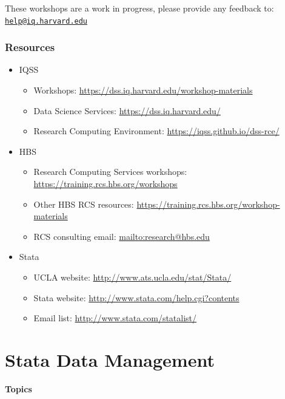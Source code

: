 \documentclass[]{book}
\providecommand{\tightlist}{%
  \setlength{\itemsep}{0pt}\setlength{\parskip}{0pt}}
\begin{document}
These workshops are a work in progress, please provide any feedback to:
\href{mailto:help@iq.harvard.edu}{\nolinkurl{help@iq.harvard.edu}}

\subsection{Resources}\label{resources-7}

\begin{itemize}
\tightlist
\item
  IQSS

  \begin{itemize}
  \tightlist
  \item
    Workshops: \url{https://dss.iq.harvard.edu/workshop-materials}
  \item
    Data Science Services: \url{https://dss.iq.harvard.edu/}
  \item
    Research Computing Environment:
    \url{https://iqss.github.io/dss-rce/}
  \end{itemize}
\item
  HBS

  \begin{itemize}
  \tightlist
  \item
    Research Computing Services workshops:
    \url{https://training.rcs.hbs.org/workshops}
  \item
    Other HBS RCS resources:
    \url{https://training.rcs.hbs.org/workshop-materials}
  \item
    RCS consulting email: \url{mailto:research@hbs.edu}
  \end{itemize}
\item
  Stata

  \begin{itemize}
  \tightlist
  \item
    UCLA website: \url{http://www.ats.ucla.edu/stat/Stata/}
  \item
    Stata website: \url{http://www.stata.com/help.cgi?contents}
  \item
    Email list: \url{http://www.stata.com/statalist/}
  \end{itemize}
\end{itemize}

\chapter{Stata Data Management}\label{stata-data-management}

\textbf{Topics}
\end{document}
